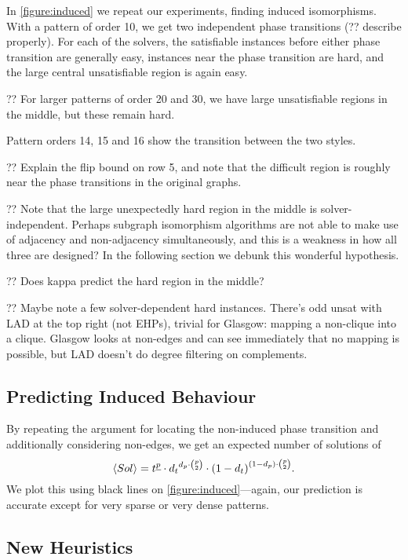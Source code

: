 \documentclass[letterpaper]{article}
\begin{document}
In \cref{figure:induced} we repeat our experiments, finding induced isomorphisms. With a pattern of
order 10, we get two independent phase transitions (?? describe properly). For each of the solvers,
the satisfiable instances before either phase transition are generally easy, instances near the
phase transition are hard, and the large central unsatisfiable region is again easy.

?? For larger patterns of order 20 and 30, we have large unsatisfiable regions in the middle,
but these remain hard.

Pattern orders 14, 15 and 16 show the transition between the two styles.

?? Explain the flip bound on row 5, and note that the difficult region is roughly near the phase
transitions in the original graphs.

?? Note that the large unexpectedly hard region in the middle is solver-independent. Perhaps
subgraph isomorphism algorithms are not able to make use of adjacency and non-adjacency
simultaneously, and this is a weakness in how all three are designed? In the following section we
debunk this wonderful hypothesis.

?? Does kappa predict the hard region in the middle?

?? Maybe note a few solver-dependent hard instances.  There's odd unsat with LAD at the top right
(not EHPs), trivial for Glasgow: mapping a non-clique into a clique. Glasgow looks at non-edges and
can see immediately that no mapping is possible, but LAD doesn't do degree filtering on complements.

\subsection{Predicting Induced Behaviour}

By repeating the argument for locating the non-induced phase transition and additionally considering
non-edges, we get an expected number of solutions of \[ \langle Sol \rangle = t^{\underline{p}}
    \cdot {d_t}^{d_p \cdot \binom{p}{2}} \cdot {(1 - d_{t})}^{(1 - d_{p}) \cdot \binom{p}{2}}
\textnormal{.} \] We plot this
using black lines on \cref{figure:induced}---again, our prediction is accurate except for very
sparse or very dense patterns.

\subsection{New Heuristics}
\end{document}

